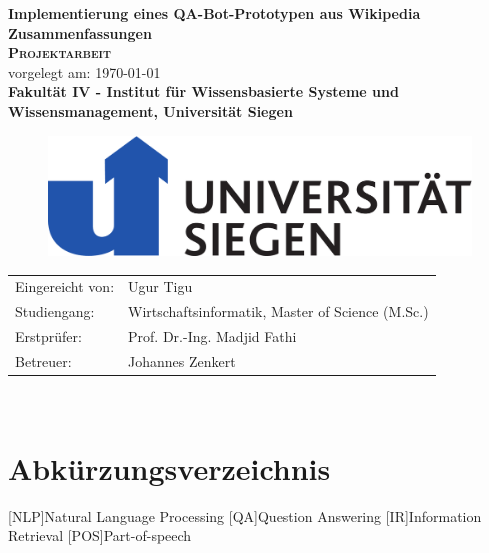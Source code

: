 \documentclass[
        ngerman,
        paper=a4,
        numbers=noendperiod,
]{scrreprt}
\begin{document}
\begin{titlepage}
    \begin{center}
    \huge \textbf{\textsf{Implementierung eines QA-Bot-Prototypen aus Wikipedia Zusammenfassungen}} \\
    \vspace{1cm}
    \LARGE\textbf{\textsc{Projektarbeit }}\\
    \vspace{1cm}
    \normalsize
    vorgelegt am: \today \\
    \vspace{2.5cm}
    \large \textbf{Fakultät IV - 
Institut für Wissensbasierte
Systeme und Wissensmanagement, Universität Siegen
}
\linebreak
\linebreak
\begin{figure}[H]
    \centering\includegraphics[width=0.4\linewidth]{images/imageuni.pdf}
    \label{fig:Unilabel}
\end{figure}
    \end{center}
    \vspace{3cm}
    \begin{center}
 \normalsize{
    \begin{tabular}{ll}
    	Eingereicht von: & {Ugur Tigu} \\
    	Studiengang: & Wirtschaftsinformatik, Master of Science (M.Sc.)\\
	Erstprüfer: & Prof. Dr.-Ing. Madjid Fathi \\
	Betreuer: &   Johannes Zenkert\\
    \end{tabular}\\
    }
\end{center}
\end{titlepage}
\setcounter{page}{0}
\tableofcontents
\clearpage 
{}
\listoffigures
\clearpage 
{}
\listoftables
\clearpage 
\chapter*{Abkürzungsverzeichnis}
\begin{acronym}

[NLP]{Natural Language Processing}
[QA]{Question Answering}
[IR]{Information Retrieval}
[POS]{Part-of-speech}

\end{acronym}
\clearpage 
{} 
\listofxequations
\clearpage
{} 
\lstlistoflistings
\clearpage
\setcounter{page}{1}
\end{document}
